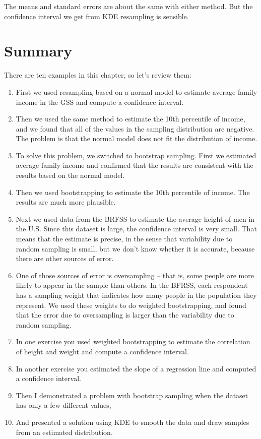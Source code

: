The means and standard errors are about the same with either method. But
the confidence interval we get from KDE resampling is sensible.


\pagebreak

\section{Summary}\label{summary}

There are ten examples in this chapter, so let's review them:

\begin{enumerate}
\def\labelenumi{\arabic{enumi}.}
\item
  First we used resampling based on a normal model to estimate average
  family income in the GSS and compute a confidence interval.
\item
  Then we used the same method to estimate the 10th percentile of
  income, and we found that all of the values in the sampling
  distribution are negative. The problem is that the normal model does
  not fit the distribution of income.
\item
  To solve this problem, we switched to bootstrap sampling. First we
  estimated average family income and confirmed that the results are
  consistent with the results based on the normal model.
\item
  Then we used bootstrapping to estimate the 10th percentile of income.
  The results are much more plausible.
\item
  Next we used data from the BRFSS to estimate the average height of men
  in the U.S. Since this dataset is large, the confidence interval is
  very small. That means that the estimate is precise, in the sense that
  variability due to random sampling is small, but we don't know whether
  it is accurate, because there are other sources of error.
\item
  One of those sources of error is oversampling -- that is, some people
  are more likely to appear in the sample than others. In the BFRSS,
  each respondent has a sampling weight that indicates how many people
  in the population they represent. We used these weights to do weighted
  bootstrapping, and found that the error due to oversampling is larger
  than the variability due to random sampling.
\item
  In one exercise you used weighted bootstrapping to estimate the
  correlation of height and weight and compute a confidence interval.
\item
  In another exercise you estimated the slope of a regression line and
  computed a confidence interval.
\item
  Then I demonstrated a problem with bootstrap sampling when the dataset
  has only a few different values,
\item
  And presented a solution using KDE to smooth the data and draw samples
  from an estimated distribution.
\end{enumerate}

